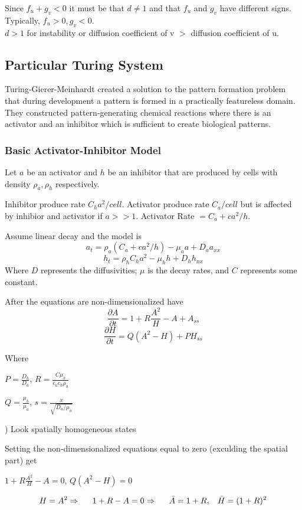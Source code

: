 \documentclass[]{article}
\numberwithin{equation}{section}		%
\begin{document}
Since $f_u+g_v<0$ it must be that $d\neq1$ and that $f_u$ and $g_v$ have different signs.
Typically, $f_u > 0, g_v < 0.$ \\
$d > 1$ for instability or diffusion coefficient of v $>$ diffusion coefficient of u.
\subsection{Particular Turing System}
Turing-Gierer-Meinhardt created a solution to the pattern formation problem that during development a pattern is formed in a practically featureless domain.  They constructed pattern-generating chemical reactions where there is an activator and an inhibitor which is sufficient to create biological patterns.

\subsubsection{Basic Activator-Inhibitor Model}
Let $a$ be an activator and $h$ be an inhibitor that are produced by cells with density $\rho_a, \rho_h$ respectively.

Inhibitor produce rate $C_h a^2/cell$.
Activator produce rate $C_a/cell$ but is affected by inhibior and activator if $a >> 1$.
Activator Rate $= C_a + ca^2/h$.

Assume linear decay and the model is
$$a_t=\rho_a(C_a+ca^2/h)-\mu_a a + D_a a_{xx}$$
$$h_t=\rho_h C_h a^2 - \mu_h h + D_h h_{xx}$$
Where $D$ represents the diffusivities; $\mu$ is the decay rates, and $C$ represents some constant.

\noindent After the equations are non-dimensionalized have
$$\frac{\partial A}{\partial t}=1+R\frac{A^2}{H}-A+A_{ss}$$
$$\frac{\partial H}{\partial t}=Q(A^2-H)+PH_{ss}$$

Where

\begin{center}
 $P=\frac{D_h}{D_a}$, \hspace{0.2in}$R=\frac{C\mu_h}{c_ac_h\rho_h}$
\end{center}

\begin{center}
 $Q=\frac{\mu_h}{\mu_a}$, \hspace{0.2in}$s=\frac{x}{\sqrt{D_a/\mu_a}}$
\end{center}

) Look spatially homogeneous states

Setting the non-dimensionalized equations equal to zero (exculding the spatial part) get
\begin{center}
$1+R\frac{A^2}{H}-A=0$, \hspace{0.2in} $Q(A^2-H)=0$
\end{center}
$$H=A^2 \Rightarrow  \hspace{0.2in} 1+R-A=0 \Rightarrow \hspace{0.2in} \bar{A}=1+R, \hspace{0.12in} \bar{H}=(1+R)^2$$
\end{document}
